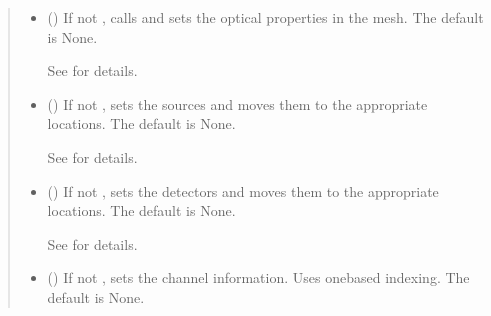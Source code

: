 \documentclass[letterpaper,10pt,english]{sphinxmanual}
\begin{document}
\begin{fulllineitems}
\begin{fulllineitems}
\begin{quote}
\begin{description}
\begin{itemize}
\item {} 
\sphinxAtStartPar
{} (\sphinxstyleliteralemphasis{\sphinxupquote{, }}) \textendash{} 
\sphinxAtStartPar
If not , calls  and sets the optical properties in the mesh. The default is None.

\sphinxAtStartPar
See {\hyperref[\detokenize{_autosummary/nirfasterff.base.stnd_mesh.stndmesh:nirfasterff.base.stnd_mesh.stndmesh.set_prop}]{}} for details.


\item {} 
\sphinxAtStartPar
{} (\sphinxstyleliteralemphasis{\sphinxupquote{, }}) \textendash{} 
\sphinxAtStartPar
If not , sets the sources and moves them to the appropriate locations. The default is None.

\sphinxAtStartPar
See {\hyperref[\detokenize{_autosummary/nirfasterff.base.optodes.optode:nirfasterff.base.optodes.optode.touch_sources}]{}} for details.


\item {} 
\sphinxAtStartPar
{} (\sphinxstyleliteralemphasis{\sphinxupquote{, }}) \textendash{} 
\sphinxAtStartPar
If not , sets the detectors and moves them to the appropriate locations. The default is None.

\sphinxAtStartPar
See {\hyperref[\detokenize{_autosummary/nirfasterff.base.optodes.optode:nirfasterff.base.optodes.optode.touch_detectors}]{}} for details.


\item {} 
\sphinxAtStartPar
{} (\sphinxstyleliteralemphasis{\sphinxupquote{, }}) \textendash{} 
\sphinxAtStartPar
If not , sets the channel information. Uses one\sphinxhyphen{}based indexing. The default is None.


\end{itemize}
\end{description}
\end{quote}
\end{fulllineitems}
\end{fulllineitems}
\end{document}
